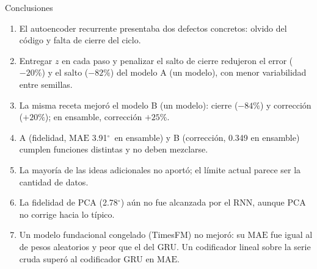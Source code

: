 \documentclass[aspectratio=169,10pt,t]{beamer}
\newcommand{\gr}{$^\circ$}
\newcommand{\mae}{\ensuremath{\mathrm{MAE}}}
\begin{document}
\begin{frame}{Conclusiones}
\begin{enumerate}\setlength{\itemsep}{4pt}
\item El autoencoder recurrente presentaba \alert{dos defectos concretos}: olvido del código y falta de cierre del ciclo.
\item Entregar $z$ en cada paso y penalizar el salto de cierre redujeron el error ($-20\%$) y el salto ($-82\%$) del modelo A (un modelo), con \alert{menor variabilidad} entre semillas.
\item La misma receta mejoró el modelo B (un modelo): cierre ($-84\%$) y corrección ($+20\%$); en ensamble, corrección $+25\%$.
\item A (fidelidad, \mae{} 3.91\gr\ en ensamble) y B (corrección, 0.349 en ensamble) cumplen funciones distintas y no deben mezclarse.
\item La mayoría de las ideas adicionales no aportó; el límite actual parece ser la \alert{cantidad de datos}.
\item La fidelidad de PCA (2.78\gr) aún no fue alcanzada por el RNN, aunque PCA no corrige hacia lo típico.
\item Un modelo fundacional congelado (TimesFM) \alert{no mejoró}: su \mae{} fue igual al de pesos aleatorios y peor que el del GRU. Un codificador lineal sobre la serie cruda superó al codificador GRU en \mae{}.
\end{enumerate}
\end{frame}
\end{document}
